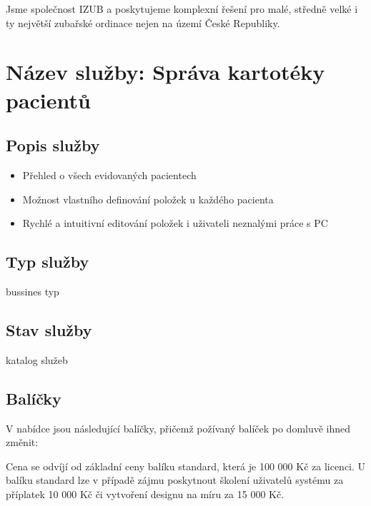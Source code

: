 \documentclass[12pt, a4paper, titlepage]{article}
\begin{document}
	\vspace{1em}

	\noindent Jsme společnost IZUB a poskytujeme komplexní řešení pro malé, středně velké i ty největší zubařské ordinace nejen na území České Republiky.
	\vspace{1em}

	\noindent\makebox[\linewidth]{\rule{16cm}{0.4pt}}

	\vspace{2em}

	\section*{Název služby: Správa kartotéky pacientů}
	\vspace{1em}

	\subsection*{Popis služby}
	\begin{itemize}
		\item Přehled o všech evidovaných pacientech
		\item Možnost vlastního definování položek u každého pacienta
		\item Rychlé a intuitivní editování položek i uživateli neznalými práce s PC
	\end{itemize}

	\subsection*{Typ služby}

	bussines typ

	\subsection*{Stav služby}

	katalog služeb

	\subsection*{Balíčky}
	V nabídce jsou následující balíčky, přičemž požívaný balíček po domluvě ihned změnit:

	\vspace{1em}

	\noindent Cena se odvíjí od základní ceny balíku standard, která je 100 000 Kč za licenci. U balíku standard lze v případě zájmu poskytnout školení uživatelů systému za příplatek 10 000 Kč či vytvoření designu na míru za 15 000 Kč.
\end{document}

